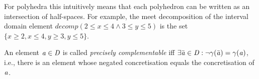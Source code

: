 For polyhedra this intuitively means that each polyhedron can be
written as an intersection of half-spaces.
%
For example, the meet decomposition of the interval domain element
$decomp(2\leq x\leq 4 \wedge 3\leq y\leq 5)$ is
the set $\{x\geq 2, x\leq 4, y\geq 3, y\leq 5\}$.

\begin{definition} 
An element $\mathit{a}\in \mathit{D}$ is called \emph{precisely complementable}
iff $\exists \bar{\mathit{a}} \in \mathit{D}: \neg\gamma(\bar{\mathit{a}})=\gamma(\mathit{a})$, 
i.e., there is an element whose negated concretisation equals
the concretisation of $\mathit{a}$.
\end{definition}

